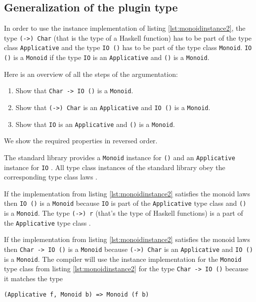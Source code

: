 \subsection{Generalization of the plugin type }
\label{sec:generalization}

In order to use the instance implementation of listing \ref{lst:monoidinstance2}, the type \verb|(->) Char| (that is the type of a Haskell function) has to be part of the type class \verb|Applicative| and the type \verb|IO ()| has to be part of the type class \verb|Monoid|. \verb|IO ()| is a \verb|Monoid| if the type \verb|IO| is an \verb|Applicative| and \verb|()| is a \verb|Monoid|.

Here is an overview of all the steps of the argumentation:
\begin{enumerate}
\item Show that \verb|Char -> IO ()| is a \verb|Monoid|.
\item Show that \verb|(->) Char| is an \verb|Applicative| and \verb|IO ()| is a \verb|Monoid|.
\item Show that \verb|IO| is an \verb|Applicative| and \verb|()| is a \verb|Monoid|.
\end{enumerate}

We show the required properties in reversed order.

\begin{etaremune}
\item The standard library provides a \verb|Monoid| instance for \verb|()| \cite{monoid} and an \verb|Applicative| instance for \verb|IO| \cite{control.applicative}. All type class instances of the standard library obey the corresponding type class laws \cite{Lipovaca}. 

\item If the implementation from listing \ref{lst:monoidinstance2} satisfies the monoid laws then \verb|IO ()| is a \verb|Monoid| because \verb|IO| is part of the \verb|Applicative| type class \cite{control.applicative} and \verb|()| is a \verb|Monoid|. The type \verb|(->) r| (that's the type of Haskell functions) is a part of the \verb|Applicative| type class \cite{control.applicative}.

\item 
If the implementation from listing \ref{lst:monoidinstance2} satisfies the monoid laws then \verb|Char -> IO ()| is a \verb|Monoid| because \verb|(->) Char| is an \verb|Applicative| and \verb|IO ()| is a \verb|Monoid|. The compiler will use the instance implementation for the \verb|Monoid| type class from listing \ref{lst:monoidinstance2} for the type \verb|Char -> IO ()| because it matches the type
\begin{verbatim}
(Applicative f, Monoid b) => Monoid (f b)
\end{verbatim}

\end{etaremune} 

